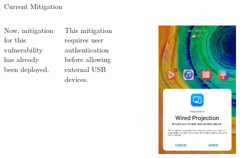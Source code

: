\documentclass{beamer}
\begin{document}
\begin{frame}{Current Mitigation}
	\begin{columns}
			Now, mitigation for this vulnerability has already been deployed.
			\vspace{1em}

			This mitigation requires user authentication before allowing external USB devices.
			\begin{figure}
				\includegraphics[width=\columnwidth]{Figs/huawei.png}
			\end{figure}
	\end{columns}
\end{frame}
\end{document}
